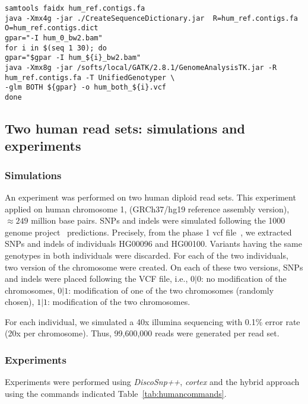 \documentclass{bmcart}
\newcommand{\discopp}{{\it DiscoSnp++}\xspace}
\newcommand{\co}{{\it cortex}\xspace}
\begin{document}
\begin{table*}[ht]
\begin{verbatim}
samtools faidx hum_ref.contigs.fa
java -Xmx4g -jar ./CreateSequenceDictionary.jar  R=hum_ref.contigs.fa  O=hum_ref.contigs.dict
gpar="-I hum_0_bw2.bam"
for i in $(seq 1 30); do
gpar="$gpar -I hum_${i}_bw2.bam"
java -Xmx8g -jar /softs/local/GATK/2.8.1/GenomeAnalysisTK.jar -R hum_ref.contigs.fa -T UnifiedGenotyper \
-glm BOTH ${gpar} -o hum_both_${i}.vcf
done

	\end{verbatim}	\normalsize
	\caption{Commands used for calling SNPs and indels from 2 to 30 E. Coli read sets ({coli\_muted\_n\_30\_genome\_$i$\_reads.fasta} for $i$ in $[1,30]$) with \discopp, \co or the hybrid approach. \label{tab:colicommands}}
\end{table*}




\subsection*{Two human read sets: simulations and experiments}
\subsubsection*{Simulations}
An experiment was performed on two human diploid read sets. This experiment applied on human chromosome 1, (GRCh37/hg19 reference assembly version), $\approx249$ million base pairs. SNPs and indels were simulated following the 1000 genome project~\cite{Altshuler2012} predictions. Precisely, from the phase 1 vcf file~\cite{vcf}, we extracted SNPs and indels of individuals HG00096 and HG00100. Variants having the same genotypes in both individuals were discarded. For each of the two individuals, two version of the chromosome were created. On each of these two versions, SNPs and indels were placed following the VCF file, i.e., $0|0$: no modification of the chromosomes, $0|1$: modification of one of the two chromosomes (randomly chosen), $1|1$: modification of the two chromosomes. 

For each individual, we simulated a 40x illumina sequencing with 0.1\% error rate (20x per chromosome). Thus, 99,600,000 reads were generated per read set. 

\subsubsection*{Experiments}
Experiments were performed using \discopp, \co and the hybrid approach using the commands indicated Table~\ref{tab:humancommands}.
\end{document}
